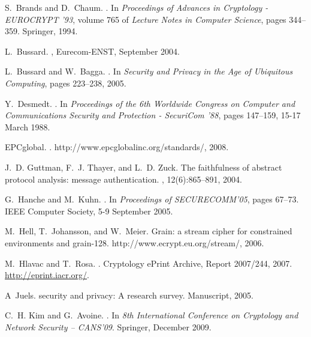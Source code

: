 \documentclass{article}
\begin{document}
\begin{thebibliography}{99}
S.~Brands and D.~Chaum.
.
\newblock In {\em {Proceedings of Advances in Cryptology - EUROCRYPT '93}},
  volume 765 of {\em Lecture Notes in Computer Science}, pages 344--359.
  Springer, 1994.

L.~Bussard.
, Eurecom-ENST, September 2004.

L.~Bussard and W.~Bagga.
.
\newblock In {\em Security and Privacy in the Age of Ubiquitous Computing},
  pages 223--238, 2005.

Y.~Desmedt.
.
\newblock In {\em Proceedings of the 6th Worldwide Congress on Computer and
  Communications Security and Protection - SecuriCom '88}, pages 147--159,
  15-17 March 1988.

EPCglobal.
.
\newblock http://www.epcglobalinc.org/standards/, 2008.

J.~D. Guttman, F.~J. Thayer, and L.~D. Zuck.
\newblock The faithfulness of abstract protocol analysis: message
  authentication.
, 12(6):865--891, 2004.

G.~Hanche and M.~Kuhn.
.
\newblock In {\em Proceedings of SECURECOMM'05}, pages 67--73. IEEE Computer
  Society, 5-9 September 2005.

M.~Hell, T.~Johansson, and W.~Meier.
\newblock Grain: a stream cipher for constrained environments and grain-128.
\newblock http://www.ecrypt.eu.org/stream/, 2006.

M.~Hlavac and T.~Rosa.
.
\newblock Cryptology ePrint Archive, Report 2007/244, 2007.
\newblock \url{http://eprint.iacr.org/}.

A~Juels.
 security and privacy: A research survey.
\newblock Manuscript, 2005.

C.~H. Kim and G.~Avoine.
.
\newblock In {\em 8th International Conference on Cryptology and Network
  Security -- CANS'09}. Springer, December 2009.


\end{thebibliography}
\end{document}
